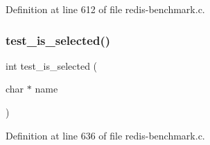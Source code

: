 Definition at line 612 of file redis-\/benchmark.\+c.

\mbox{\label{redis-benchmark_8c_a9e8afa52639855135cffe1d230c80a84}} 
\subsubsection{\texorpdfstring{test\+\_\+is\+\_\+selected()}{test\_is\_selected()}}
{\footnotesize\ttfamily int test\+\_\+is\+\_\+selected (\begin{DoxyParamCaption}\item[{char $\ast$}]{name }\end{DoxyParamCaption})}



Definition at line 636 of file redis-\/benchmark.\+c.

